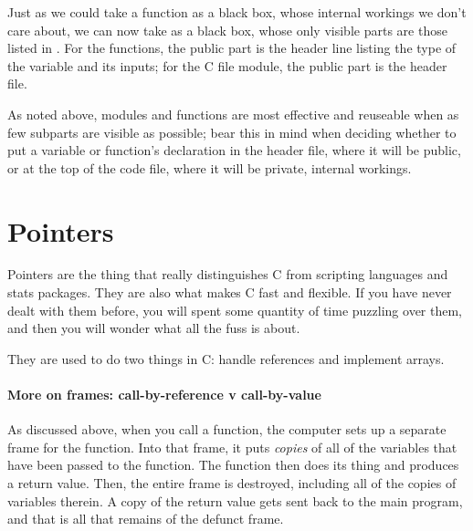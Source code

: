 \documentclass[12pt]{article}
\def\ind#1{\index{#1}#1}
\begin{document}
Just as we could take a function as a black box, whose internal workings
we don't care about, we can now take  as a black box,
whose only visible parts are those listed in . For the functions, the public part is the
header line listing the type of the variable and its inputs; for the C file module, the public part is
the header file. 

As noted above, modules and functions are most effective and  reuseable when as few
subparts are visible as possible; bear this in mind when deciding whether to put a variable or
function's declaration in the header file, where it will be public, or at the top of the code file,
where it will be private, internal workings.

 \label{prepointers}\section{Pointers} \label{pointers} 

Pointers are the thing that really distinguishes C from scripting
languages and stats packages. They are also what makes C fast and
flexible. If you have never dealt with them before, you will spent some
quantity of time puzzling over them, and then you will wonder what all the
fuss is about. 

They are used to do two things in C: handle references and implement arrays.

\paragraph{More on \ind{frames}: \ind{call-by-reference} v \ind{call-by-value}}

As discussed above,
when you call a function, the computer sets up a separate frame
for the function. Into that frame, it puts {\it copies} of all of the
variables that have been passed to the function. The function then does its
thing and produces a return value. Then, the entire frame is destroyed,
including all of the copies of variables therein. A copy of the return value gets
sent back to the main program, and that is all that remains of the defunct
frame. 
\end{document}
